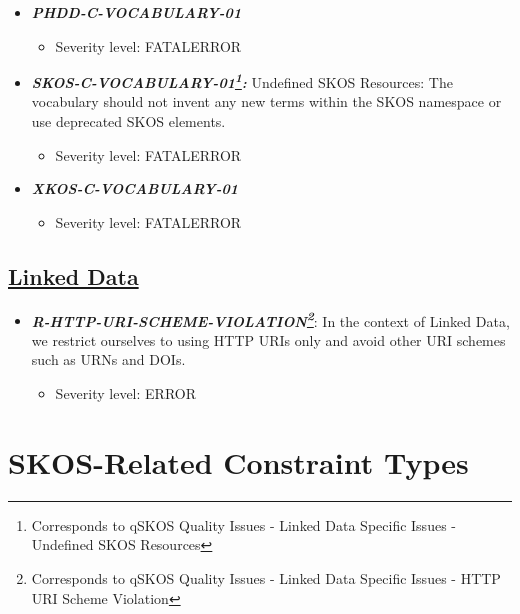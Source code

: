 \documentclass{llncs}
\begin{document}
\begin{itemize}
	\item \textbf{\em PHDD-C-VOCABULARY-01} 
	\begin{itemize}
		\item Severity level: FATALERROR
	\end{itemize}
\end{itemize}

\begin{itemize}
	\item \textbf{{\em SKOS-C-VOCABULARY-01\footnote{Corresponds to qSKOS Quality Issues - Linked Data Specific Issues - Undefined SKOS Resources}:}}
	Undefined SKOS Resources:
	The vocabulary should not invent any new terms within the SKOS namespace or use deprecated SKOS elements. 
	\begin{itemize}
		\item Severity level: FATALERROR
	\end{itemize}
\end{itemize}

\begin{itemize}
	\item \textbf{\em XKOS-C-VOCABULARY-01} 
	\begin{itemize}
		\item Severity level: FATALERROR
	\end{itemize}
\end{itemize}

\subsection{\underline{Linked Data}}

\begin{itemize}
	\item \textbf{\em R-HTTP-URI-SCHEME-VIOLATION\footnote{Corresponds to qSKOS Quality Issues - Linked Data Specific Issues - HTTP URI Scheme Violation}}: 
	In the context of Linked Data, we restrict ourselves to using HTTP URIs only and avoid other URI schemes such as URNs and DOIs.
	\begin{itemize}
		\item Severity level: ERROR
	\end{itemize}
\end{itemize}

\section{SKOS-Related Constraint Types}
\end{document}
